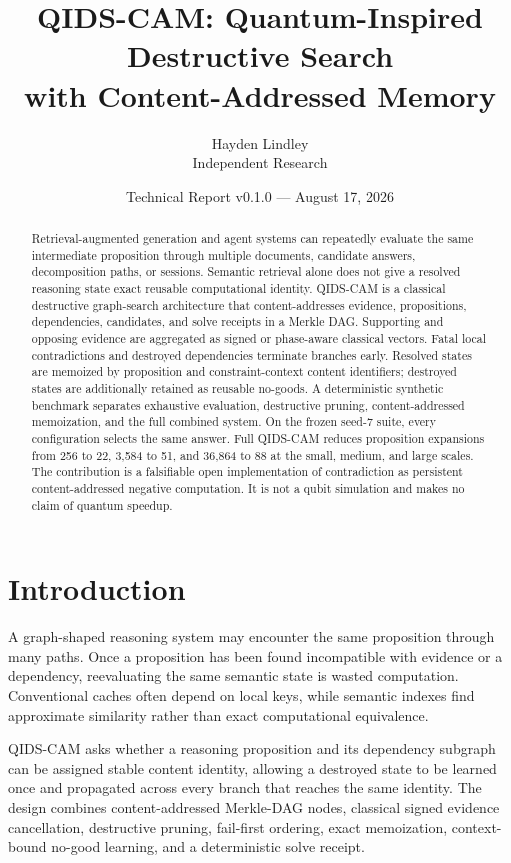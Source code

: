 \documentclass[11pt]{article}
\title{QIDS-CAM: Quantum-Inspired Destructive Search\\with Content-Addressed Memory}
\author{Hayden Lindley\\Independent Research}
\date{Technical Report v0.1.0 --- August 17, 2026}
\begin{document}
\maketitle

\begin{abstract}
Retrieval-augmented generation and agent systems can repeatedly evaluate the same intermediate proposition through multiple documents, candidate answers, decomposition paths, or sessions. Semantic retrieval alone does not give a resolved reasoning state exact reusable computational identity. QIDS-CAM is a classical destructive graph-search architecture that content-addresses evidence, propositions, dependencies, candidates, and solve receipts in a Merkle DAG. Supporting and opposing evidence are aggregated as signed or phase-aware classical vectors. Fatal local contradictions and destroyed dependencies terminate branches early. Resolved states are memoized by proposition and constraint-context content identifiers; destroyed states are additionally retained as reusable no-goods. A deterministic synthetic benchmark separates exhaustive evaluation, destructive pruning, content-addressed memoization, and the full combined system. On the frozen seed-7 suite, every configuration selects the same answer. Full QIDS-CAM reduces proposition expansions from 256 to 22, 3,584 to 51, and 36,864 to 88 at the small, medium, and large scales. The contribution is a falsifiable open implementation of contradiction as persistent content-addressed negative computation. It is not a qubit simulation and makes no claim of quantum speedup.
\end{abstract}

\section{Introduction}
A graph-shaped reasoning system may encounter the same proposition through many paths. Once a proposition has been found incompatible with evidence or a dependency, reevaluating the same semantic state is wasted computation. Conventional caches often depend on local keys, while semantic indexes find approximate similarity rather than exact computational equivalence.

QIDS-CAM asks whether a reasoning proposition and its dependency subgraph can be assigned stable content identity, allowing a destroyed state to be learned once and propagated across every branch that reaches the same identity. The design combines content-addressed Merkle-DAG nodes, classical signed evidence cancellation, destructive pruning, fail-first ordering, exact memoization, context-bound no-good learning, and a deterministic solve receipt.
\end{document}
